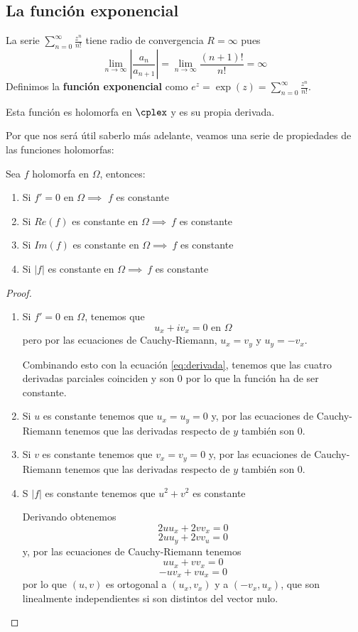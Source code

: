 \documentclass{apuntes}
\begin{document}
\subsection{La función exponencial}
\begin{defn}
La serie $\sum_{n=0}^{\infty}\frac{z^n}{n!}$ tiene radio de convergencia $R=\infty$ pues
\[\lim_{n \to \infty}\left| \frac{a_n}{a_{n+1}}\right| = \lim_{n \to \infty} \frac{(n+1)!}{n!} = \infty\]
Definimos la \textbf{función exponencial} como $e^z=\exp(z)=\sum_{n=0}^{\infty}\frac{z^n}{n!}$.

Esta función es holomorfa en $\cplex$ y es su propia derivada.
\end{defn}

Por que nos será útil saberlo más adelante, veamos una serie de propiedades de las funciones holomorfas:
\begin{prop}
Sea $f$ holomorfa en $\Omega$, entonces:
\begin{enumerate}
\item Si $f'=0$ en $\Omega \implies $ $f$ es constante
\item Si $Re(f)$ es constante en $\Omega \implies \ f$ es constante
\item Si $Im(f)$ es constante en $\Omega \implies \ f$ es constante
\item Si $|f|$ es constante en $\Omega \implies \ f$ es constante
\end{enumerate}
\end{prop}
\begin{proof}
\begin{enumerate}
\item Si $f'=0$ en $\Omega$, tenemos que
\begin{equation}\label{eq:derivada}
u_x+iv_x = 0 \text{ en }\Omega
\end{equation}
pero por las ecuaciones de Cauchy-Riemann, $u_x=v_y$ y $u_y=-v_x$.

Combinando esto con la ecuación \eqref{eq:derivada}, tenemos que las cuatro derivadas parciales coinciden y son 0 por lo que la función ha de ser constante.

\item Si $u$ es constante tenemos que $u_x=u_y=0$ y, por las ecuaciones de Cauchy-Riemann tenemos que las derivadas respecto de $y$ también son 0.

\item Si $v$ es constante tenemos que $v_x=v_y=0$ y, por las ecuaciones de Cauchy-Riemann tenemos que las derivadas respecto de $y$ también son 0.

\item S $|f|$ es constante tenemos que $u^2+v^2$ es constante

Derivando obtenemos
\[2uu_x+2vv_x=0\]
\[2uu_y+2vv_u=0\]
y, por las ecuaciones de Cauchy-Riemann tenemos
\[uu_x+vv_x =0\]
\[-uv_x+vu_x = 0\]
por lo que $(u,v)$ es ortogonal a $(u_x,v_x)$ y a $(-v_x,u_x)$, que son linealmente independientes si son distintos del vector nulo.

\end{enumerate}
\end{proof}
\end{document}
